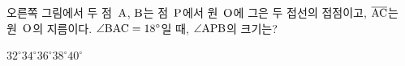 \noindent\begin{minipage}[t]{0.58\linewidth}\vspace{0pt}\raggedright 오른쪽 그림에서 두 점~$\mathrm{A}$, $\mathrm{B}$는 점~$\mathrm{P}$에서 원~$\mathrm{O}$에 그은 두 접선의 접점이고, $\overline{\mathrm{AC}}$는 원~$\mathrm{O}$의 지름이다. $\angle\mathrm{BAC}=18^\circ$일 때, $\angle\mathrm{APB}$의 크기는?\end{minipage}\hfill\begin{minipage}[t]{0.4\linewidth}\vspace{0pt}\centering \resizebox{\ifdim\width>\linewidth\linewidth\else\width\fi}{!}{}\end{minipage}\par
\begin{choices32}{$32^\circ$}{$34^\circ$}{$36^\circ$}{$38^\circ$}{$40^\circ$}\end{choices32}

